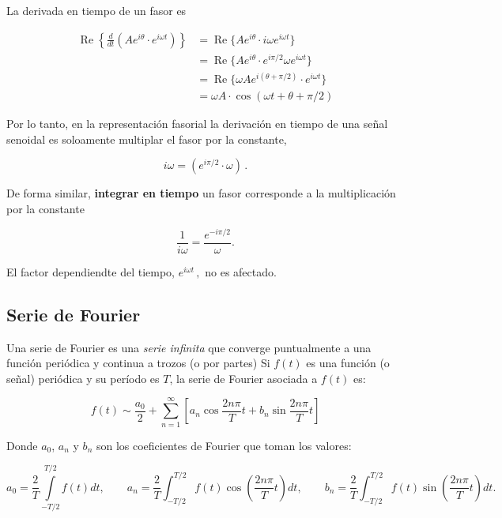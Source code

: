 \documentclass{article}
\begin{document}
    La derivada en tiempo de un fasor es

\begin{align*}
\operatorname{Re}\left\{\frac{d}{d t}(A e^{i\theta} \cdot e^{i\omega t})\right\}
&= \operatorname{Re}\{A e^{i\theta} \cdot i\omega e^{i\omega t}\} \\
&= \operatorname{Re}\{A e^{i\theta} \cdot e^{i\pi/2} \omega e^{i\omega t}\} \\
&= \operatorname{Re}\{\omega A e^{i(\theta + \pi/2)} \cdot e^{i\omega t}\} \\
&= \omega A\cdot \cos(\omega t + \theta + \pi/2)
\end{align*}

Por lo tanto, en la representación fasorial la derivación en tiempo de
una señal senoidal es soloamente multiplar el fasor por la constante,

\begin{equation}
i \omega = (e^{i\pi/2} \cdot \omega)\,.
\end{equation}

De forma similar, \textbf{integrar en tiempo} un fasor corresponde a la
multiplicación por la constante

\begin{equation}
\frac{1}{i\omega} = \frac{e^{-i\pi/2}}{\omega}.
\end{equation}

El factor dependiendte del tiempo, $e^{i\omega t}\,,$ no es afectado.


    \subsection{Serie de Fourier}


    Una serie de Fourier es una \emph{serie infinita} que converge
puntualmente a una función periódica y continua a trozos (o por partes)
Si $f(t)$ es una función (o señal) periódica y su período es $T$, la
serie de Fourier asociada a $f(t)$ es:

\begin{equation}
f(t) \sim \frac{a_0}{2} + \sum_{n=1}^\infty\left[a_n\cos\frac{2n\pi}{T}t + b_n\sin\frac{2n\pi}{T}t\right]
\end{equation}

Donde $a_0$, $a_n$ y $b_n$ son los coeficientes de Fourier que toman los
valores:

\[
a_0 = \frac{2}{T} \int \limits_{-T/2}^{T/2} f(t) dt, \qquad a_n = \frac{2}{T} \int_{-T/2}^{T/2} f(t) \cos \left( \frac{2n \pi}{T} t \right) dt, \qquad b_n=\frac{2}{T} \int_{-T/2}^{T/2} f(t) \sin \left(\frac{2n\pi}{T}t\right) dt.
\]
\end{document}
